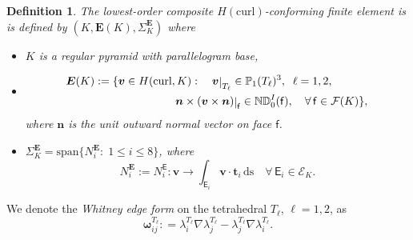 \documentclass[twoside,reqno,final]{amsart}
\renewcommand{\b}[1]{{\boldsymbol{#1}}}
\providecommand{\NDOne}[1]{\mathbb{ND}^{I}_{#1}}
\def\restrict#1{\raise-0.2ex\hbox{\ensuremath|}_{#1}}
\newcommand{\EG}{\mathcal{E}}
\newcommand{\FC}{\mathcal{F}}
\newcommand{\egI}{\mathsf{E}}
\newcommand{\fc}{\mathsf{f}}
\newcommand{\bld}[1]{\boldsymbol{#1}}
\newcommand{\grads}{{\nabla}}
\newtheorem{definition}[theorem]{Definition}
\newcommand{\pol}{\mathbb{P}}
\begin{document}
\begin{definition}
\label{Hcurl-def}
The lowest-order 
composite $H(\mathrm{curl})$-conforming finite element is is defined by 
$(K, \b E(K), \Sigma^{\b E}_K)$ where
\begin{itemize}
\item $K$ is a regular pyramid with parallelogram base,
 \item 
 \begin{alignat}{3}
\label{Hcurl}
\bld E(K) :=&\; \{\b v \in H(\mathrm{curl},K):&& \;
\b v\restrict{T_\ell}\in \pol_1(T_\ell)^3,\;\; \ell = 1,2,\\
& &&\!\!\!\!\!\!\!\!\!\!\!\!\!\!\!\!\!\!\b n\times (\b v\times \b n)\restrict{\fc}\in \NDOne{0}(\fc),\quad\forall\, \fc\in \FC(K)\},\nonumber
\end{alignat}
where $\b n$ is the unit outward normal vector on face $\fc$.
\item $\Sigma_K^{\b E}=\mathrm{span}\{N_i^{\b E}:\;1\le i\le 8\}$, where
\[
 N_i^{\b E}:= N_i^{\egI}: \b v\longrightarrow \int_{\egI_i} \b v\cdot \b t_i\,\mathrm{ds} \quad \forall\, \egI_i\in \EG_K.
\]
\end{itemize}
\end{definition}


We denote the {\it Whitney edge form} on the tetrahedral $T_\ell$, $\ell=1,2$, as
\[
\b\omega_{ij}^{T_\ell}: = \lambda_i^{T_\ell}\grads\lambda_j^{T_{\ell}}
-\lambda_j^{T_\ell}\grads\lambda_i^{T_{\ell}}.
\]
\end{document}
